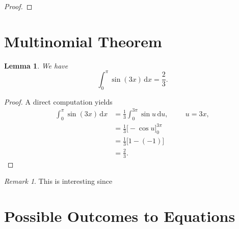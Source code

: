 \documentclass{article}
\theoremstyle{plain}
\newtheorem{lemma}{Lemma}
\theoremstyle{definition}
\theoremstyle{remark}
\newtheorem{remark}{Remark}
\renewcommand{\d}{\mathrm{d}}
\begin{document}
\begin{proof}

\end{proof}


\section{Multinomial Theorem}

\begin{lemma}
	We have
	\[
		\int_0^\pi \sin(3x)\,\d x = \frac{2}{3}.
	\]
\end{lemma}

\begin{proof}
	A direct computation yields
	\begin{align*}
		\int_0^\pi \sin(3x)\,\d x
			&=	\frac{1}{3}\int_0^{3\pi} \sin u \,\d u,		\hspace{1cm} u=3x,		\\
			&=	\frac{1}{3} \big[-\cos u\big]_0^{3\pi}						\\
			&=	\frac{1}{3} \big[1-(-1)\big]						\\
			&=	\frac{2}{3}.
	\end{align*}
\end{proof}

\begin{remark}
	This is interesting since\textellipsis
\end{remark}

\section{Possible Outcomes to Equations}
\end{document}
